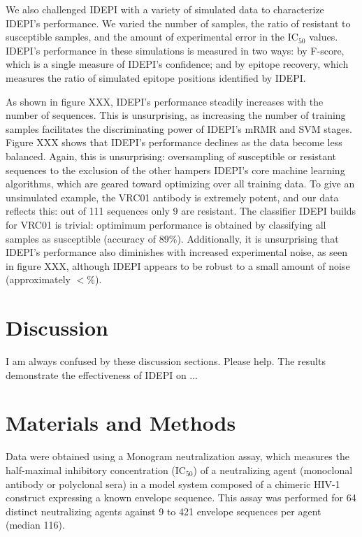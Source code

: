 \documentclass[10pt]{article}
\newcommand{\hmic}{{IC}$_{50}$}
\newcommand{\idepi}{{IDEPI}}
\newcommand{\hiv}{{HIV}-1}
\newcommand{\mrmr}{{mRMR}}
\newcommand{\svm}{{SVM}}
\begin{document}
We also challenged \idepi{} with a variety of simulated data to characterize \idepi{}'s performance.
We varied the number of samples,
the ratio of resistant to susceptible samples,
and the amount of experimental error in the \hmic{} values.
\idepi{}'s performance in these simulations is measured in two ways:
by F-score, which is a single measure of \idepi{}'s confidence;
and by epitope recovery, which measures the ratio of simulated epitope positions identified by \idepi{}.

As shown in figure XXX, \idepi{}'s performance steadily increases with the number of sequences.
This is unsurprising, as increasing the number of training samples facilitates the discriminating power of \idepi{}'s \mrmr{} and \svm{} stages.
Figure XXX shows that \idepi{}'s performance declines as the data become less balanced.
Again, this is unsurprising: oversampling of susceptible or resistant sequences to the exclusion of the other
hampers \idepi{}'s core machine learning algorithms,
which are geared toward optimizing over all training data.
To give an unsimulated example, the {VRC01} antibody is extremely potent,
and our data reflects this: out of 111 sequences only 9 are resistant.
The classifier \idepi{} builds for {VRC01} is trivial:
optimimum performance is obtained by classifying all samples as susceptible (accuracy of 89\%).
Additionally, it is unsurprising that \idepi{}'s performance also diminishes with increased experimental noise,
as seen in figure XXX, although \idepi{} appears to be robust to a small amount of noise (approximately $ < \%$).

\section*{Discussion}

I am always confused by these discussion sections. Please help.
The results demonstrate the effectiveness of \idepi{} on ...

\section*{Materials and Methods}
Data were obtained using a Monogram neutralization assay,
which measures the half-maximal inhibitory concentration (\hmic{})
of a neutralizing agent (monoclonal antibody or polyclonal sera) in a model system composed of a chimeric \hiv{} construct expressing a known envelope sequence.
This assay was performed for 64 distinct neutralizing agents against 9 to 421 envelope sequences per agent (median 116).
\end{document}
